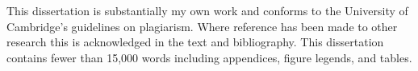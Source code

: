 
\begin{declaration}

This dissertation is substantially my own work and conforms to the University of Cambridge’s guidelines on plagiarism. Where reference has been made to other research this is acknowledged in the text and bibliography. This dissertation contains fewer than 15,000 words including appendices, figure legends, and tables.

\end{declaration}

